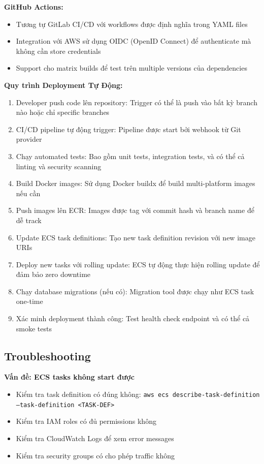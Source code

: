 \textbf{GitHub Actions:}
\begin{itemize}
    \item Tương tự GitLab CI/CD với workflows được định nghĩa trong YAML files
    \item Integration với AWS sử dụng OIDC (OpenID Connect) để authenticate mà không cần store credentials
    \item Support cho matrix builds để test trên multiple versions của dependencies
\end{itemize}

\textbf{Quy trình Deployment Tự Động:}
\begin{enumerate}
    \item Developer push code lên repository: Trigger có thể là push vào bất kỳ branch nào hoặc chỉ specific branches
    \item CI/CD pipeline tự động trigger: Pipeline được start bởi webhook từ Git provider
    \item Chạy automated tests: Bao gồm unit tests, integration tests, và có thể cả linting và security scanning
    \item Build Docker images: Sử dụng Docker buildx để build multi-platform images nếu cần
    \item Push images lên ECR: Images được tag với commit hash và branch name để dễ track
    \item Update ECS task definitions: Tạo new task definition revision với new image URIs
    \item Deploy new tasks với rolling update: ECS tự động thực hiện rolling update để đảm bảo zero downtime
    \item Chạy database migrations (nếu có): Migration tool được chạy như ECS task one-time
    \item Xác minh deployment thành công: Test health check endpoint và có thể cả smoke tests
\end{enumerate}

\subsection{Troubleshooting}

\textbf{Vấn đề: ECS tasks không start được}
\begin{itemize}
    \item Kiểm tra task definition có đúng không: \texttt{aws ecs describe-task-definition --task-definition <TASK-DEF>}
    \item Kiểm tra IAM roles có đủ permissions không
    \item Kiểm tra CloudWatch Logs để xem error messages
    \item Kiểm tra security groups có cho phép traffic không
\end{itemize}

